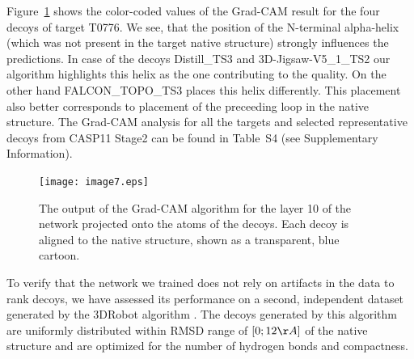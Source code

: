 \documentclass{bioinfo}
\begin{document}
Figure~\ref{Fig:GradCAMT0776_more} shows the color-coded
values of the Grad-CAM result for the four decoys of target T0776.
We see, that the position of the N-terminal alpha-helix (which was not present in the target native structure) 
strongly influences the predictions. In case of the decoys Distill\_TS3 and 3D-Jigsaw-V5\_1\_TS2 our algorithm 
highlights this helix as the one contributing to the quality. On the other hand FALCON\_TOPO\_TS3 places this helix 
differently. This placement also better corresponds to placement of the preceeding loop in the native structure.
The Grad-CAM analysis for all the targets and selected representative decoys from CASP11 Stage2 can be found in 
Table~S4 (see Supplementary Information).
\begin{figure}[!tpb]
    \texttt{[image: image7.eps]}
    \caption{The output of the Grad-CAM algorithm for the layer 10 of the network
    projected onto the atoms of the decoys. Each decoy is aligned to
    the native structure, shown as a transparent, blue cartoon.}
    \label{Fig:GradCAMT0776_more}
\end{figure}

To verify that the network we trained does not rely on artifacts in
the data to rank decoys, we have assessed its performance on a second,
independent dataset generated by the 3DRobot
algorithm \citep{deng20163drobot}. The decoys generated by this
algorithm are uniformly distributed within RMSD range of $[0; 12\AA]$
of the native structure and are optimized for the number of hydrogen
bonds and compactness.
\end{document}
